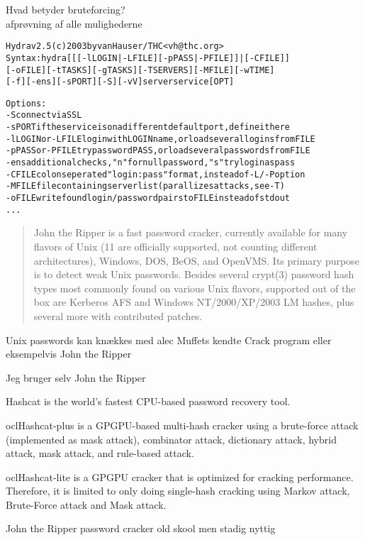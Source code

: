 \documentclass[20pt,landscape,a4paper,footrule]{foils}
\begin{document}

\begin{list1}
\item Hvad betyder bruteforcing?\\
afprøvning af alle mulighederne
\end{list1}

\begin{alltt}
\small
Hydra v2.5 (c) 2003 by van Hauser / THC <vh@thc.org>
Syntax: hydra [[[-l LOGIN|-L FILE] [-p PASS|-P FILE]] | [-C FILE]]
[-o FILE] [-t TASKS] [-g TASKS] [-T SERVERS] [-M FILE] [-w TIME]
[-f] [-e ns] [-s PORT] [-S] [-vV] server service [OPT]

Options:
  -S        connect via SSL
  -s PORT   if the service is on a different default port, define it here
  -l LOGIN  or -L FILE login with LOGIN name, or load several logins from FILE
  -p PASS   or -P FILE try password PASS, or load several passwords from FILE
  -e ns     additional checks, "n" for null password, "s" try login as pass
  -C FILE   colon seperated "login:pass" format, instead of -L/-P option
  -M FILE   file containing server list (parallizes attacks, see -T)
  -o FILE   write found login/password pairs to FILE instead of stdout
...
\end{alltt}


\begin{quote}
John the Ripper is a fast password cracker, currently available for
many flavors of Unix (11 are officially supported, not counting
different architectures), Windows, DOS, BeOS, and OpenVMS. Its primary
purpose is to detect weak Unix passwords. Besides several crypt(3)
password hash types most commonly found on various Unix flavors,
supported out of the box are Kerberos AFS and Windows NT/2000/XP/2003
LM hashes, plus several more with contributed patches.
\end{quote}

\begin{list1}
\item Unix passwords kan knækkes med alec Muffets kendte Crack program
  eller eksempelvis John the Ripper 
\item Jeg bruger selv John the Ripper
\end{list1}


\begin{list2}
\item Hashcat is the world's fastest CPU-based password recovery tool.
\item oclHashcat-plus is a GPGPU-based multi-hash cracker using a brute-force attack (implemented as mask attack), combinator attack, dictionary attack, hybrid attack, mask attack, and rule-based attack.
\item oclHashcat-lite is a GPGPU cracker that is optimized for cracking performance. Therefore, it is limited to only doing single-hash cracking using Markov attack, Brute-Force attack and Mask attack.
\item John the Ripper password cracker old skool men stadig nyttig
\end{list2}
\end{document}
